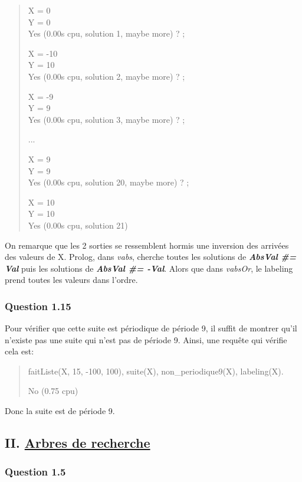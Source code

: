 \documentclass[
]{article}
\begin{document}
\begin{quote}
X = 0\\
Y = 0\\
Yes (0.00s cpu, solution 1, maybe more) ? ;

X = -10\\
Y = 10\\
Yes (0.00s cpu, solution 2, maybe more) ? ;

X = -9\\
Y = 9\\
Yes (0.00s cpu, solution 3, maybe more) ? ;

...

X = 9\\
Y = 9\\
Yes (0.00s cpu, solution 20, maybe more) ? ;

X = 10\\
Y = 10\\
Yes (0.00s cpu, solution 21)
\end{quote}

On remarque que les 2 sorties se ressemblent hormis une inversion des
arrivées des valeurs de X. Prolog, dans \emph{vabs}, cherche toutes les
solutions de \textbf{\emph{AbsVal \#= Val}} puis les solutions de
\textbf{\emph{AbsVal \#= -Val}}. Alors que dans \emph{vabsOr}, le
labeling prend toutes les valeurs dans l'ordre.

\hypertarget{header-n50}{%
\subsubsection{Question 1.15}\label{header-n50}}

Pour vérifier que cette suite est périodique de période 9, il suffit de
montrer qu'il n'existe pas une suite qui n'est pas de période 9. Ainsi,
une requête qui vérifie cela est:

\begin{quote}
faitListe(X, 15, -100, 100), suite(X), non\_periodique9(X), labeling(X).

No (0.75 cpu)
\end{quote}

Donc la suite est de période 9.

\hypertarget{header-n56}{%
\subsection{\texorpdfstring{II. \underline{Arbres de
recherche}}{II. Arbres de recherche}}\label{header-n56}}

\hypertarget{header-n57}{%
\subsubsection{Question 1.5}\label{header-n57}}
\end{document}
